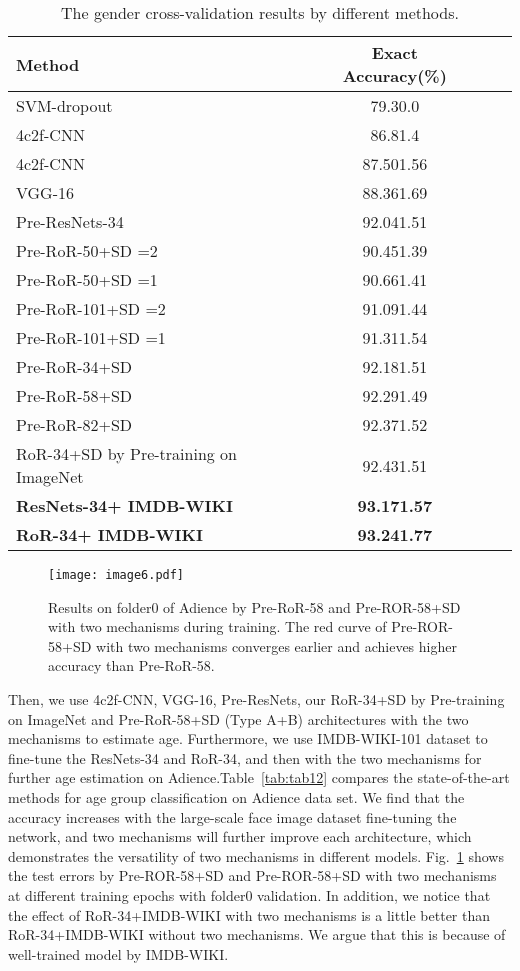 \documentclass[journal]{IEEEtran}
\begin{document}
\begin{table}[h]
\caption{The gender cross-validation results by different methods.}
\centering
\begin{tabular}{|l|c|c|c|}
\hline
Method  &Exact Accuracy(\%)  \\ 
\hline\hline
SVM-dropout~\cite{AgeSVMdrop}     &79.30.0  \\
\hline
4c2f-CNN~\cite{Agegenderbycnn}      &86.81.4 \\
\hline
4c2f-CNN    &87.501.56 \\
\hline
VGG-16      &88.361.69 \\
\hline
Pre-ResNets-34    &92.041.51 \\
\hline
Pre-RoR-50+SD =2 &90.451.39 \\
\hline
Pre-RoR-50+SD =1 &90.661.41 \\
\hline
Pre-RoR-101+SD =2  &91.091.44 \\
\hline
Pre-RoR-101+SD =1  &91.311.54 \\
\hline
Pre-RoR-34+SD   &92.181.51 \\
\hline
Pre-RoR-58+SD   &92.291.49 \\
\hline
Pre-RoR-82+SD   &92.371.52 \\
\hline
RoR-34+SD by Pre-training on ImageNet  &92.431.51 \\
\hline
\textbf{ResNets-34+ IMDB-WIKI}  &\textbf{93.171.57} \\
\hline
\textbf{RoR-34+ IMDB-WIKI}  &\textbf{93.241.77} \\
\hline
\end{tabular}

\label{tab:tab11}
\end{table}


\begin{figure}
\centering
\texttt{[image: image6.pdf]}
\caption{Results on folder0 of Adience by Pre-RoR-58 and Pre-ROR-58+SD with two mechanisms during training. The red curve of Pre-ROR-58+SD with two mechanisms converges earlier and achieves higher accuracy than Pre-RoR-58.}
\label{fig:image6}
\end{figure}
Then, we use 4c2f-CNN, VGG-16, Pre-ResNets, our RoR-34+SD by Pre-training on ImageNet and Pre-RoR-58+SD (Type A+B) architectures with the two mechanisms to estimate age. Furthermore, we use IMDB-WIKI-101 dataset to fine-tune the ResNets-34 and RoR-34, and then with the two mechanisms for further age estimation on Adience.Table~\ref{tab:tab12} compares the state-of-the-art methods for age group classification on Adience data set. We find that the accuracy increases with the large-scale face image dataset fine-tuning the network, and two mechanisms will further improve each architecture, which demonstrates the versatility of two mechanisms in different models. Fig.~\ref{fig:image6} shows the test errors by Pre-ROR-58+SD and Pre-ROR-58+SD with two mechanisms at different training epochs with folder0 validation. In addition, we notice that the effect of RoR-34+IMDB-WIKI with two mechanisms is a little better than RoR-34+IMDB-WIKI without two mechanisms. We argue that this is because of well-trained model by IMDB-WIKI. 
\end{document}
